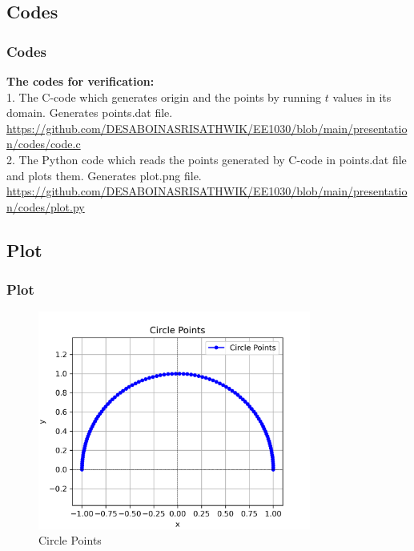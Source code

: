 \documentclass{beamer}
\theoremstyle{remark}
\numberwithin{equation}{section}
\begin{document}
\subsection{Codes}
\begin{frame}
\frametitle{Codes}
	\textbf{The codes for verification:}\\
1. The C-code which generates origin and the points by running $t$ values in its domain. Generates points.dat file.\\
 {\footnotesize
    \url{https://github.com/DESABOINASRISATHWIK/EE1030/blob/main/presentation/codes/code.c}
    }\\

2. The Python code which reads the points generated by C-code in points.dat file and plots them. Generates plot.png file.\\
 {\footnotesize
    \url{https://github.com/DESABOINASRISATHWIK/EE1030/blob/main/presentation/codes/plot.py}
	}

\end{frame}
\subsection{Plot}
\begin{frame}
	\frametitle{Plot}
\begin{figure}[h!]
    \centering
    \includegraphics[width=0.8\textwidth]{figs/plot.png} 
    \caption{Circle Points}
    \label{fig:circle_plot}
\end{figure}

\end{frame}
\end{document}

